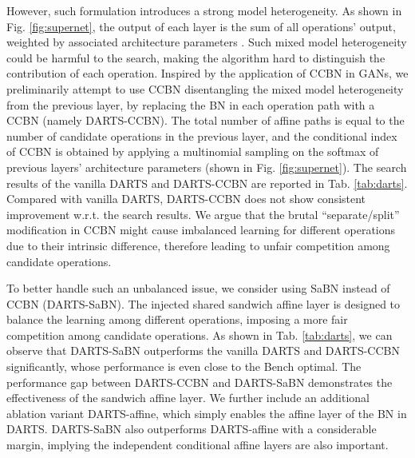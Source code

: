 \documentclass{article}
\begin{document}
\begin{table}[t!]
\caption{\textbf{The ground-truth top-1 accuracy of the final searched architecture on NAS-Bench-201.} DARTS-SaBN achieves the highest accuracy, with the lowest standard deviation. Bench optimal denotes the best test accuracy achievable in NAS-Bench-201.}
\label{tab:darts}
\small
\centering
{}
\end{table}
However, such formulation introduces a strong model heterogeneity. As shown in Fig. \ref{fig:supernet}, the output of each layer is the sum of all operations' output, weighted by associated architecture parameters . Such mixed model heterogeneity could be harmful to the search, making the algorithm hard to distinguish the contribution of each operation. Inspired by the application of CCBN in GANs, we preliminarily attempt to use CCBN disentangling the mixed model heterogeneity from the previous layer, by replacing the BN in each operation path with a CCBN (namely DARTS-CCBN). The total number of affine paths is equal to the number of candidate operations in the previous layer, and the conditional index  of CCBN is obtained by applying a multinomial sampling on the softmax of previous layers’ architecture parameters (shown in  Fig. \ref{fig:supernet}). The search results of the vanilla DARTS and DARTS-CCBN are reported in Tab. \ref{tab:darts}. Compared with vanilla DARTS, DARTS-CCBN does not show consistent improvement w.r.t. the search results. We argue that the brutal “separate/split” modiﬁcation in CCBN might cause imbalanced learning for different operations due to their intrinsic difference, therefore leading to unfair competition among candidate operations. 

To better handle such an unbalanced issue, we consider using SaBN instead of CCBN (DARTS-SaBN). The injected shared sandwich affine layer is designed to balance the learning among different operations, imposing a more fair competition among candidate operations. As shown in Tab. \ref{tab:darts}, we can observe that DARTS-SaBN outperforms the vanilla DARTS and DARTS-CCBN significantly, whose performance is even close to the Bench optimal. The performance gap between DARTS-CCBN and DARTS-SaBN demonstrates the effectiveness of the sandwich affine layer. We further include an additional ablation variant DARTS-affine, which simply enables the affine layer of the BN in DARTS. DARTS-SaBN also outperforms DARTS-affine with a considerable margin, implying the independent conditional affine layers are also important.
\end{document}
